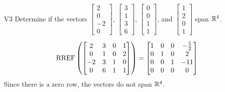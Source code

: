 \begin{problem}{V3}
Determine if the vectors \(\begin{bmatrix} 2 \\ 0 \\ -2 \\ 0 \end{bmatrix}\), \(\begin{bmatrix} 3 \\ 1 \\ 3 \\ 6 \end{bmatrix}\), \(\begin{bmatrix} 0 \\ 0 \\ 1 \\ 1 \end{bmatrix}\), and \(\begin{bmatrix}1 \\ 2 \\ 0 \\ 1 \end{bmatrix}\) span \(\mathbb{R}^4\).
\end{problem}
\begin{solution}
\[\operatorname{RREF}\left( \begin{bmatrix} 2 & 3 & 0 & 1 \\ 0 & 1 & 0 & 2 \\ -2 & 3 & 1 & 0 \\ 0 & 6 & 1 & 1\end{bmatrix} \right) = \begin{bmatrix}1 & 0 & 0 & -\frac{5}{2} \\ 0 & 1 & 0 & 2 \\ 0 & 0 & 1 & -11\\ 0 & 0 & 0 & 0  \end{bmatrix}\]
Since there is a zero row, the vectors do not span \(\mathbb{R}^4\).
\end{solution}

